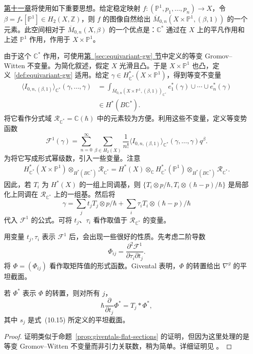 \hyperref[chap:mirror-theorem]{第十一章}将使用如下重要思想。给定稳定映射 $f:(\mathbb P^1,p_1,\ldots,p_n)\to X$，令 $\beta=f_*[\mathbb P^1]\in H_2(X,\mathbb Z)$，则 $f$ 的图像自然给出 $\overline M_{0,n}(X\times\mathbb P^1,(\beta,1))$ 的一个元素。此空间相对于 $\overline M_{0,n}(X,\beta)$ 的一个优点是：$\mathbb C^*$ 通过在 $X$ 上的平凡作用和上述 $\mathbb P^1$ 作用，作用于 $X\times\mathbb P^1$。

由于这个 $\mathbb C^*$ 作用，可使用\hyperref[sec:equivariant-gw]{第~\ref*{sec:equivariant-gw} 节}中定义的等变 Gromov--Witten 不变量。为简化叙述，假定 $X$ 光滑且凸。于是 $X\times\mathbb P^1$ 也凸，定义~\ref{def:equivariant-gw} 适用。给定 $\gamma\in H_{\mathbb C^*}^*(X\times\mathbb P^1)$，得到等变不变量
\[
\begin{aligned}
\langle I_{0,n,(\beta,1)}\rangle_{\mathbb C^*}(\gamma,\ldots,\gamma)
&=\int_{\overline M_{0,n}(X\times\mathbb P^1,(\beta,1))_{\mathbb C^*}}
e_1^*(\gamma)\cup\cdots\cup e_n^*(\gamma)\\
&\in H^*(B\mathbb C^*).
\end{aligned}
\]
将它看作分式域 $\mathcal R_{\mathbb C^*}=\mathbb C(\hbar)$ 中的元素较为方便。利用这些不变量，定义等变势函数
\[
\mathcal F^1(\gamma)=\sum_{n=0}^{\infty}\sum_{\beta\in H_2(X)}\frac1{n!}
\langle I_{0,n,(\beta,1)}\rangle_{\mathbb C^*}(\gamma,\ldots,\gamma)q^\beta.
\]
为将它写成形式幂级数，引入一些变量。注意
\[
\begin{aligned}
H_{\mathbb C^*}^*(X\times\mathbb P^1)\otimes_{H^*(B\mathbb C^*)}\mathcal R_{\mathbb C^*}
=H^*(X)\otimes_{\mathbb C}H_{\mathbb C^*}^*(\mathbb P^1)
\otimes_{H^*(B\mathbb C^*)}\mathcal R_{\mathbb C^*}.
\end{aligned}
\]
因此，若 $T_i$ 为 $H^*(X)$ 的一组上同调基，则 $\{T_i\otimes p/\hbar,T_i\otimes(\hbar-p)/\hbar\}$ 是局部化上同调在 $\mathcal R_{\mathbb C^*}$ 上的一组基。然后将
\[
\gamma=\sum_jt_jT_j\otimes p/\hbar
+\sum_i\tau_iT_i\otimes(\hbar-p)/\hbar
\]
代入 $\mathcal F^1$ 的公式。可将 $t_j$、$\tau_i$ 看作取值于 $\mathcal R_{\mathbb C^*}$ 的变量。

用变量 $t_j,\tau_i$ 表示 $\mathcal F^1$ 后，会出现一些很好的性质。先考虑二阶导数
\[
\Phi_{ij}=\frac{\partial^2\mathcal F^1}{\partial\tau_i\partial t_j}.
\]
将 $\Phi=(\Phi_{ij})$ 看作取矩阵值的形式函数。Givental 表明，$\Phi$ 的转置给出 $\nabla^g$ 的平坦截面。
\begin{proposition}\label{prop:graph-space-flat-matrix}
若 $\Phi^*$ 表示 $\Phi$ 的转置，则对所有 $j$，
\[
\hbar\frac{\partial}{\partial t_j}\Phi^*=T_j*\Phi^*,
\]
其中 $s_j$ 是式~(10.15) 所定义的平坦截面。
\end{proposition}
\begin{proof}
证明类似于命题~\ref{prop:giventals-flat-sections} 的证明，但因为这里处理的是等变 Gromov--Witten 不变量而非引力关联数，稍为简单。详细证明见 。
\end{proof}

